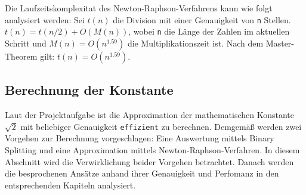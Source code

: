 \documentclass[course=erap]{aspdoc}
\begin{document}
Die Laufzeitskomplexitat des Newton-Raphson-Verfahrens kann wie folgt analysiert werden: Sei $t(n)$ die Division mit einer Genauigkeit von \texttt{n} Stellen. $t(n) = t(n/2) + O(M(n))$, wobei \texttt{n} die Länge der Zahlen im aktuellen Schritt  und $M(n) = O(n^{1.59})$  die Multiplikationszeit ist. Nach  dem Master-Theorem gilt: $t(n) = O(n^{1.59})$.

\subsection{Berechnung der Konstante}
Laut der Projektaufgabe ist die Approximation der mathematischen Konstante $\sqrt{2}$ mit beliebiger Genauigkeit \texttt{effizient} zu berechnen. Demgemäß werden zwei Vorgehen zur Berechnung vorgeschlagen: Eine Auswertung mittels Binary Splitting und eine Approximation mittels Newton-Raphson-Verfahren. In diesem Abschnitt wird die Verwirklichung beider Vorgehen betrachtet. Danach werden die besprochenen Ansätze anhand ihrer Genauigkeit und Perfomanz in den entsprechenden Kapiteln analysiert.
\end{document}
